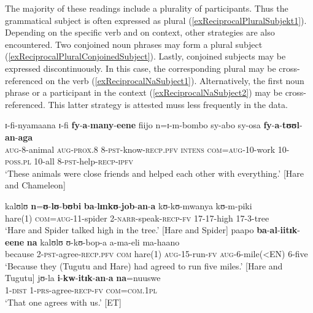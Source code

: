\protect{}

The majority of these readings include a plurality of participants. Thus the grammatical subject is often expressed as plural (\ref{exReciprocalPluralSubjekt1}).
Depending on the specific verb and on context, other strategies are also encountered. Two conjoined noun phrases may form a plural subject (\ref{exReciprocalPluralConjoinedSubject}). Lastly, conjoined subjects may be expressed discontinuously. In this case, the corresponding plural may be cross-referenced on the verb (\ref{exReciprocalNaSubject1}).
Alternatively, the first noun phrase or a participant in the context (\ref{exReciprocalNaSubject2}) may be cross-referenced. This latter strategy is attested muss less frequently in the data.

\begin{exe}
	\ex\label{exReciprocalPluralSubjekt1}
	\gll ɪ-fi-nyamaana ɪ-fi \textbf{fy}-\textbf{a}-\textbf{many}-\textbf{eene} fiijo n=ɪ-m-bombo sy-abo sy-osa \textbf{fy}-\textbf{a}-\textbf{tʊʊl}-\textbf{an}-\textbf{aga}\\
	\textsc{aug}-8-animal \textsc{aug}-\textsc{prox.8} 8-\textsc{pst}-know-\textsc{recp.pfv} \textsc{intens} \textsc{com}=\textsc{aug}-10-work 10-\textsc{poss.pl} 10-all 8-\textsc{pst}-help-\textsc{recp}-\textsc{ipfv}\\
	
	\glt \lq These animals were close friends and helped each other with everything.' [Hare and Chameleon]
	
	
	\ex\label{exReciprocalPluralConjoinedSubject}
	\gll kalʊlʊ \textbf{n}=\textbf{ʊ}-\textbf{lʊ}-\textbf{bʊbi} \textbf{ba}-\textbf{lɪnkʊ}-\textbf{job}-\textbf{an}-\textbf{a} kʊ-kʊ-mwanya kʊ-m-piki\\
	hare(1) \textsc{com}=\textsc{aug}-11-spider 2-\textsc{narr}-speak-\textsc{recp}-\textsc{fv} 17-17-high 17-3-tree\\
	\glt \lq Hare and Spider talked high in the tree.' [Hare and Spider]
	\ex\label{exReciprocalNaSubject1} \gll paapo \textbf{ba}-\textbf{al}-\textbf{iitɪk}-\textbf{eene} \textbf{na} kalʊlʊ ʊ-kʊ-bop-a a-ma-eli ma-haano\\
	because 2-\textsc{pst}-agree-\textsc{recp.pfv} \textsc{com} hare(1) \textsc{aug}-15-run-\textsc{fv} \textsc{aug}-6-mile(<EN) 6-five\\
	\glt \lq Because they (Tugutu and Hare) had agreed to run five miles.' [Hare and Tugutu]
	\ex\label{exReciprocalNaSubject2}
	\gll jʊ-la \textbf{i}-\textbf{kw}-\textbf{itɪk}-\textbf{an}-\textbf{a} \textbf{na}=nuuswe\\
	1-\textsc{dist} 1-\textsc{prs}-agree-\textsc{recp}-\textsc{fv} \textsc{com}=\textsc{com.1pl}\\
	\glt \lq That one agrees with us.' [ET]
\end{exe}
